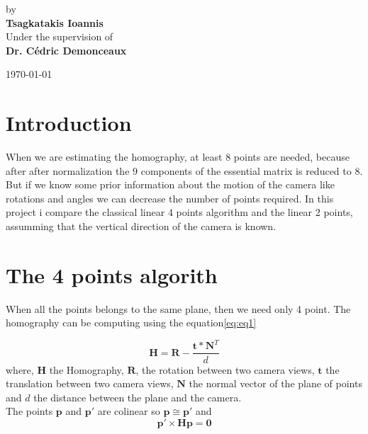 \documentclass[a4paper,12pt]{article}
\begin{document}
\begin{center}
{ \Large 
	by \\[0.25cm]
	\textbf{Tsagkatakis Ioannis} \\[1.5cm]
	Under the supervision of \\[0.25cm]
	\textbf{Dr. Cédric Demonceaux} \\
}
\end{center}

\vspace*{2cm}

\begin{center}
	\today
\end{center}
\newpage

\section{Introduction}

When we are estimating the homography, at least 8 points are needed, because after after normalization the 9 components of
the essential matrix is reduced to 8. But if we know some prior information about the motion of the camera like rotations and 
angles we can decrease the number of points required. In this project i compare the classical linear 4 points algorithm and the
linear 2 points, assumming that the vertical direction of the camera is known.

\section{The 4 points algorith} 
When all the points belongs to the same plane, then we need only 4 point. The homography can be computing using the equation\eqref{eq:eq1}

\begin{equation}
	\mathbf{H} = \mathbf{R} - \frac{\mathbf{t} \ast \mathbf{N}^T }{d}
	\label{eq:eq1}
\end{equation}
where, $\mathbf{H}$ the  Homography, 
 $\mathbf{R}$, the rotation between two camera views,
$\mathbf{t}$ the translation between two camera views,
$\mathbf{N}$ the normal vector of the plane of points and
$d$ the distance between the plane and the camera.\\[8pt]

The points $\mathbf{p}$ and $\mathbf{p}'$ are colinear so $\mathbf{p} \cong \mathbf{p}'$ and 
\begin{equation}
	\mathbf{p}' \times \mathbf{H} \mathbf{p} = \mathbf{0}
	\label{eq:eq2}
\end{equation}
\end{document}
